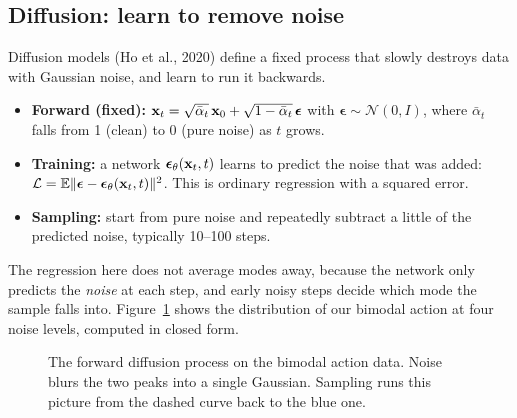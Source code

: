 \subsection{Diffusion: learn to remove noise}
Diffusion models (Ho et al., 2020) define a fixed process that slowly destroys data with Gaussian noise, and learn to run it backwards.
\begin{itemize}
\item \textbf{Forward (fixed):} $\mathbf{x}_t=\sqrt{\bar\alpha_t}\,\mathbf{x}_0+\sqrt{1-\bar\alpha_t}\,\bm\epsilon$ with $\bm\epsilon\sim\mathcal N(0,I)$, where $\bar\alpha_t$ falls from 1 (clean) to 0 (pure noise) as $t$ grows.
\item \textbf{Training:} a network $\bm\epsilon_\theta(\mathbf{x}_t,t)$ learns to predict the noise that was added: $\mathcal L=\mathbb{E}\lVert\bm\epsilon-\bm\epsilon_\theta(\mathbf{x}_t,t)\rVert^2$. This is ordinary regression with a squared error.
\item \textbf{Sampling:} start from pure noise and repeatedly subtract a little of the predicted noise, typically 10--100 steps.
\end{itemize}
The regression here does not average modes away, because the network only predicts the \emph{noise} at each step, and early noisy steps decide which mode the sample falls into. Figure~\ref{fig:diff} shows the distribution of our bimodal action at four noise levels, computed in closed form.

\begin{figure}[h]
\centering
{}
\caption{The forward diffusion process on the bimodal action data. Noise blurs the two peaks into a single Gaussian. Sampling runs this picture from the dashed curve back to the blue one.}
\label{fig:diff}
\end{figure}

